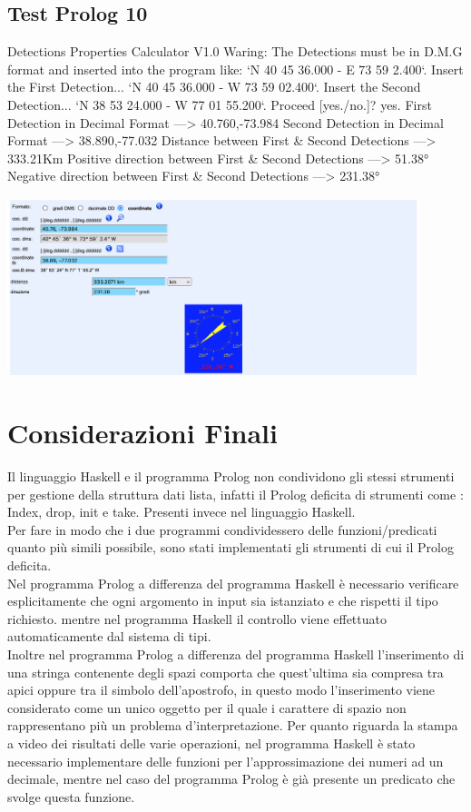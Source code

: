 \documentclass{article}
\begin{document}
\subsection*{Test Prolog 10}
	\begin{spverbatim}
		Detections Properties Calculator V1.0
		Waring: The Detections must be in D.M.G format and inserted into the program like: `N 40 45 36.000 - E 73 59 2.400`.
		Insert the First Detection...
		`N 40 45 36.000 - W 73 59 02.400`.
		Insert the Second Detection...
		`N 38 53 24.000 - W 77 01 55.200`.
		Proceed [yes./no.]?
		yes.
		First Detection in Decimal Format ---> 40.760,-73.984
		Second Detection in Decimal Format ---> 38.890,-77.032
		Distance between First & Second Detections ---> 333.21Km
		Positive direction between First & Second Detections ---> 51.38°
		Negative direction between First & Second Detections ---> 231.38°
	\end{spverbatim}
	\includegraphics[width=0.9\textwidth]{Prolog_Tests/10-Calculation_of_Distant_Coordinates_Check}
\newpage

\section{Considerazioni Finali}
\raggedright

Il linguaggio Haskell e il programma Prolog non condividono gli stessi strumenti per gestione della struttura dati lista, infatti il Prolog deficita di strumenti come : Index, drop, init e take. Presenti invece nel linguaggio Haskell.\\
Per fare in modo che i due programmi condividessero delle funzioni/predicati quanto più simili possibile, sono stati implementati gli strumenti di cui il Prolog deficita.\\
Nel programma Prolog a differenza del programma Haskell è necessario verificare esplicitamente che ogni argomento in input sia istanziato e che rispetti il tipo richiesto. mentre nel programma Haskell il controllo viene effettuato automaticamente dal sistema di tipi.\\
Inoltre nel programma Prolog a differenza del programma Haskell l'inserimento di una stringa contenente degli spazi comporta che quest'ultima sia compresa tra apici oppure tra il simbolo dell'apostrofo, in questo modo l'inserimento viene considerato come un unico oggetto per il quale i carattere di spazio non rappresentano più un problema d'interpretazione.
Per quanto riguarda la stampa a video dei risultati delle varie operazioni, nel programma Haskell è stato necessario implementare delle funzioni per l'approssimazione dei numeri ad un decimale, mentre nel caso del programma Prolog è già presente un predicato che svolge questa funzione.
\end{document}
